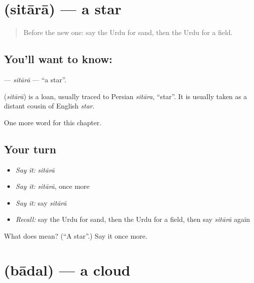 \section[\texorpdfstring{\ur{ستارہ} (sitārā)}{ستارہ (sitārā)}]{ (sitārā) — a star}

\label{lesson:UR-C65-sitara}



\begin{quote}
Before the new one: say the Urdu for sand, then the Urdu for a field.
\end{quote}

\subsection*{You'll want to know: }
\textbf{} — \emph{sitārā} — \textquotedblleft{}a star\textquotedblright{}.

\begin{cousinweb}
\textbf{} (\emph{sitārā}) is a loan, usually traced to Persian \emph{sitāra}, \textquotedblleft{}star\textquotedblright{}. It is usually taken as a distant cousin of English \emph{star}.
\end{cousinweb}

\begin{grammarlens}[title={What you've built}]
One more word for this chapter.
\end{grammarlens}

\subsection*{Your turn}
\begin{itemize}
\raggedright
  \item \emph{Say it:} \emph{sitārā}
  \item \emph{Say it:} \emph{sitārā}, once more
  \item \emph{Say it:} say \emph{sitārā}
  \item \emph{Recall:} say the Urdu for sand, then the Urdu for a field, then say \emph{sitārā} again
\end{itemize}

\begin{tcolorbox}[breakable,colback=teal!4,colframe=teal!35!black,title={Before you move on}]
What does  mean? (\textquotedblleft{}A star\textquotedblright{}.) Say it once more.
\end{tcolorbox}
\section[\texorpdfstring{\ur{بادل} (bādal)}{بادل (bādal)}]{ (bādal) — a cloud}

